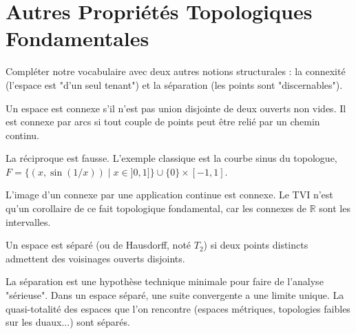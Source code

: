 \section{Autres Propriétés Topologiques Fondamentales}

\begin{objectif}
    Compléter notre vocabulaire avec deux autres notions structurales : la connexité (l'espace est "d'un seul tenant") et la séparation (les points sont "discernables").
\end{objectif}

\begin{definition}[Connexité]
    Un espace est connexe s'il n'est pas union disjointe de deux ouverts non vides. Il est connexe par arcs si tout couple de points peut être relié par un chemin continu.
\end{definition}

\begin{proposition}
    La réciproque est fausse. L'exemple classique est la courbe sinus du topologue, $F = \{ (x, \sin(1/x)) \mid x \in ]0,1] \} \cup \{0\} \times [-1,1]$.
\end{proposition}

\begin{theorem}
    L'image d'un connexe par une application continue est connexe. Le TVI n'est qu'un corollaire de ce fait topologique fondamental, car les connexes de $\mathbb{R}$ sont les intervalles.
\end{theorem}

\begin{definition}
    Un espace est séparé (ou de Hausdorff, noté $T_2$) si deux points distincts admettent des voisinages ouverts disjoints.
\end{definition}

\begin{remark}
    La séparation est une hypothèse technique minimale pour faire de l'analyse "sérieuse". Dans un espace séparé, une suite convergente a une limite unique. La quasi-totalité des espaces que l'on rencontre (espaces métriques, topologies faibles sur les duaux...) sont séparés.
\end{remark}